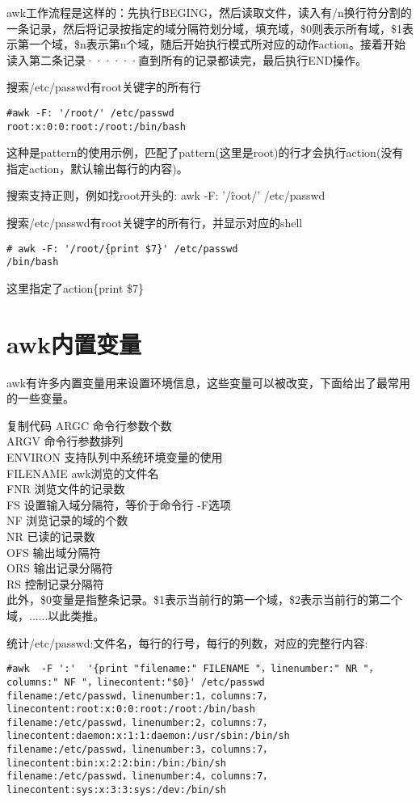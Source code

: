 \documentclass[12pt]{article}
\begin{document}
awk工作流程是这样的：先执行BEGING，然后读取文件，读入有/n换行符分割的一条记录，然后将记录按指定的域分隔符划分域，填充域，\$0则表示所有域，\$1表示第一个域，\$n表示第n个域，随后开始执行模式所对应的动作action。接着开始读入第二条记录······直到所有的记录都读完，最后执行END操作。
 

搜索/etc/passwd有root关键字的所有行
\begin{lstlisting} 
#awk -F: '/root/' /etc/passwd
root:x:0:0:root:/root:/bin/bash
\end{lstlisting} 
这种是pattern的使用示例，匹配了pattern(这里是root)的行才会执行action(没有指定action，默认输出每行的内容)。

搜索支持正则，例如找root开头的: awk -F: '/\^root/' /etc/passwd

 

搜索/etc/passwd有root关键字的所有行，并显示对应的shell
\begin{lstlisting} 
# awk -F: '/root/{print $7}' /etc/passwd             
/bin/bash
\end{lstlisting} 
 这里指定了action\{print \$7\}


\section{awk内置变量}
awk有许多内置变量用来设置环境信息，这些变量可以被改变，下面给出了最常用的一些变量。

复制代码
ARGC               命令行参数个数\\ 
ARGV               命令行参数排列\\ 
ENVIRON            支持队列中系统环境变量的使用\\
FILENAME           awk浏览的文件名\\
FNR                浏览文件的记录数\\
FS                 设置输入域分隔符，等价于命令行 -F选项\\
NF                 浏览记录的域的个数\\
NR                 已读的记录数\\
OFS                输出域分隔符\\
ORS                输出记录分隔符\\
RS                 控制记录分隔符\\
此外，\$0变量是指整条记录。\$1表示当前行的第一个域，\$2表示当前行的第二个域，......以此类推。

 
统计/etc/passwd:文件名，每行的行号，每行的列数，对应的完整行内容:
\begin{lstlisting} 
#awk  -F ':'  '{print "filename:" FILENAME "，linenumber:" NR "，columns:" NF "，linecontent:"$0}' /etc/passwd
filename:/etc/passwd，linenumber:1，columns:7，linecontent:root:x:0:0:root:/root:/bin/bash
filename:/etc/passwd，linenumber:2，columns:7，linecontent:daemon:x:1:1:daemon:/usr/sbin:/bin/sh
filename:/etc/passwd，linenumber:3，columns:7，linecontent:bin:x:2:2:bin:/bin:/bin/sh
filename:/etc/passwd，linenumber:4，columns:7，linecontent:sys:x:3:3:sys:/dev:/bin/sh
\end{lstlisting} 
\end{document}
